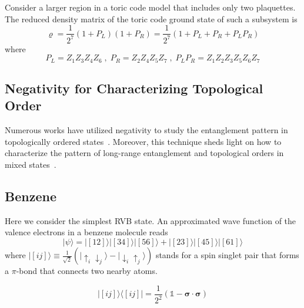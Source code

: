\documentclass[12font]{article}
\numberwithin{equation}{section}    %
\theoremstyle{definition}
\newcommand{\bra}[1]{\langle #1 |}
\newcommand{\ket}[1]{| #1 \rangle}
\newcommand{\lr}[1]{\left(  #1  \right)}
\newcommand{\bog}[1]{\boldsymbol{#1}}
\begin{document}
Consider a larger region in a toric code model that includes only two plaquettes. The reduced density matrix of the toric code ground state of such a subsystem is
\begin{equation}\label{eq:2loop-TC-rho}
    \varrho = \frac{1}{2^7}\lr{1 + P_L}\lr{1 + P_R} = \frac{1}{2^7}\lr{1 + P_L + P_R + P_LP_R}
\end{equation}
where
\[
P_L = Z_1Z_3Z_4Z_6 \;,\; P_R = Z_2Z_4Z_5Z_7 \;,\; P_LP_R = Z_1Z_2Z_3Z_5Z_6Z_7
\]

\subsection{Negativity for Characterizing Topological Order}

Numerous works have utilized negativity to study the entanglement pattern in topologically ordered states~\cite{Lee-Vidal_2013, Castelnovo_2013}. Moreover, this technique sheds light on how to characterize the pattern of long-range entanglement and topological orders in mixed states~\cite{Lu-Hsieh-Grover_2020, Wang-Wu-Wang_2025, Lu-Vijay_2023}.

\subsection{Benzene}
Here we consider the simplest RVB state. An approximated wave function of the valence electrons in a benzene molecule reads
\[
\ket{\psi} = \ket{[12]}\ket{[34]}\ket{[56]} + \ket{[23]}\ket{[45]}\ket{[61]}
\]
where $\ket{[ij]} \equiv \frac{1}{\sqrt{2}}\lr{\ket{\uparrow_i \downarrow_j} - \ket{\downarrow_i\uparrow_j}}$ stands for a spin singlet pair that forms a $\pi$-bond that connects two nearby atoms.   

\[
\ket{[ij]}\bra{[ij]} = \frac{1}{2^2}\lr{\mathds{1} - \bog{\sigma}\cdot\bog{\sigma}}
\]
\end{document}
